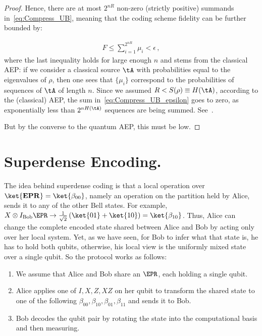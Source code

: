 \documentclass[12pt,a4paper]{article}
\begin{document}
\begin{proof}
{        Hence, there are at most $2^{nR}$ non-zero (strictly positive)
        summands in~\eqref{eq:Compress_UB}, meaning that the coding scheme
        fidelity can be further bounded by:

        \begin{align}
        \label{eq:Compress_UB_epsilon}
            F \leq \sum_{i=1}^{2^{nR}} \mu_i < \epsilon \,,
        \end{align}
        where the last inequality holds for large enough $n$ and stems from
        the classical AEP: if we consider a classical source $\tA$ with
        probabilities equal to the eigenvalues of $\rho$, then one sees that
        $\{\mu_i\}$ correspond to the probabilities of sequences of $\tA$ of
        length $n$. Since we assumed $R < S(\rho) \equiv H(\tA)$, according
        to the (classical) AEP, the sum in~\eqref{eq:Compress_UB_epsilon}
        goes to zero, as exponentially less than $2^{nH(\tA)}$ sequences are
        being summed. See~\cite[ch. 3]{CoverBook}.}
        But by the converse to the quantum AEP, this must be low.
\end{proof}


\section{Superdense Encoding.} 
The idea behind superdense coding is that a local operation over $\ket{\mathbf{EPR}}=\ket{\beta_{00}}$, namely an operation on the partition held by Alice, sends it to any of the other Bell states. For example, $X \otimes I_{\text{Bob}} \EPR \rightarrow \frac{1}{\sqrt{2}}\left( \ket{01} + \ket{10} \right) = \ket{\beta_{10}} $. Thus, Alice can change the complete encoded state shared between Alice and Bob by acting only over her local system. Yet, as we have seen, for Bob to infer what that state is, he has to hold both qubits, otherwise, his local view is the uniformly mixed state over a single qubit. So the protocol works as follows:
\begin{enumerate}
  \item  We assume that Alice and Bob share an $\EPR$, each holding a single qubit.
  \item  Alice applies one of $I, X, Z, XZ$ on her qubit to transform the shared state to one of the following $\beta_{00}, \beta_{10}, \beta_{01}, \beta_{11}$ and sends it to Bob.
  \item Bob decodes the qubit pair by rotating the state into the computational basis and then measuring.
\end{enumerate}
\end{document}
